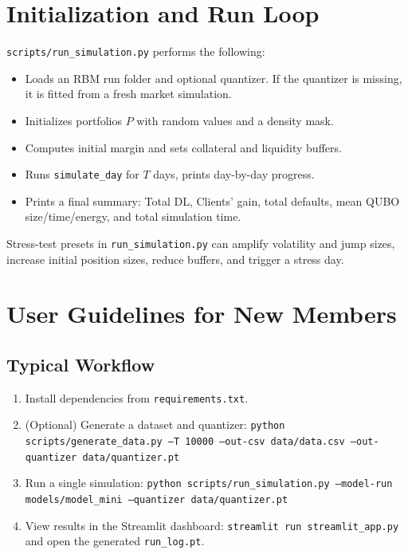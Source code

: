 \documentclass[11pt]{article}
\begin{document}
\section{Initialization and Run Loop}
\texttt{scripts/run\_simulation.py} performs the following:
\begin{itemize}[leftmargin=*]
  \item Loads an RBM run folder and optional quantizer. If the quantizer is missing,
  it is fitted from a fresh market simulation.
  \item Initializes portfolios $P$ with random values and a density mask.
  \item Computes initial margin and sets collateral and liquidity buffers.
  \item Runs \texttt{simulate\_day} for $T$ days, prints day-by-day progress.
  \item Prints a final summary: Total DL, Clients' gain, total defaults, mean QUBO
  size/time/energy, and total simulation time.
\end{itemize}
Stress-test presets in \texttt{run\_simulation.py} can amplify volatility and jump
sizes, increase initial position sizes, reduce buffers, and trigger a stress day.

\section{User Guidelines for New Members}
\subsection{Typical Workflow}
\begin{enumerate}[leftmargin=*]
  \item Install dependencies from \texttt{requirements.txt}.
  \item (Optional) Generate a dataset and quantizer:
  \texttt{python scripts/generate\_data.py --T 10000 --out-csv data/data.csv --out-quantizer data/quantizer.pt}
  \item Run a single simulation:
  \texttt{python scripts/run\_simulation.py --model-run models/model\_mini --quantizer data/quantizer.pt}
  \item View results in the Streamlit dashboard:
  \texttt{streamlit run streamlit\_app.py} and open the generated \texttt{run\_log.pt}.
\end{enumerate}
\end{document}
